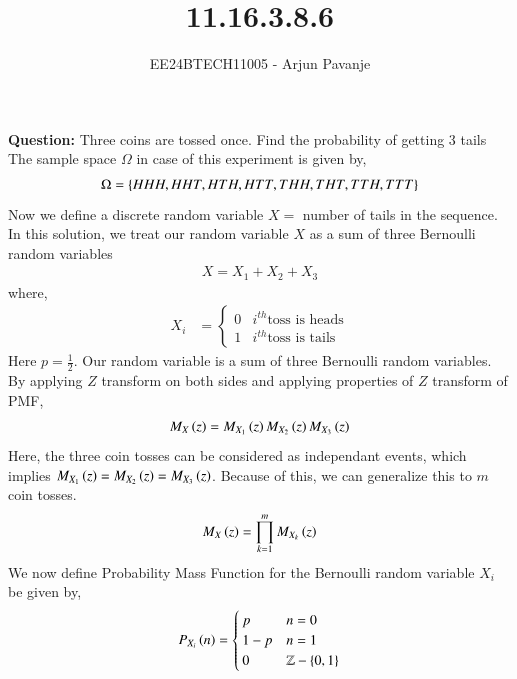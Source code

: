 \documentclass[journal]{IEEEtran}
\begin{document}

\vspace{3cm}

\title{11.16.3.8.6}
\author{EE24BTECH11005 - Arjun Pavanje}
{\let\newpage\relax\maketitle}
\textbf{Question:}\newline
Three coins are tossed once. Find the probability of getting 3 tails \newline
\solution \newline
The sample space $\Omega$ in case of this experiment is given by,
\begin{align}
  \Omega = \left\{HHH, HHT, HTH, HTT, THH, THT, TTH, TTT\right\}
\end{align} 
Now we define a discrete random variable $X =$ number of tails in the sequence. In this solution, we treat our random variable $X$ as a sum of three Bernoulli random variables
\begin{align}
 X = X_1 + X_2 + X_3
\end{align}
where,
\begin{align}
  X_i &= \begin{cases}
    0 & i^{th}\text{toss is heads}\\
    1 & i^{th}\text{toss is tails}
  \end{cases}
\end{align}
Here $p = \frac{1}{2}$. Our random variable is a sum of three Bernoulli random variables. By applying $Z$ transform on both sides and applying properties of $Z$ transform of PMF, 
\begin{align}
  M_X\left(z\right) = M_{X_1}\left(z\right) M_{X_2}\left(z\right)M_{X_3}\left(z\right) 
\end{align}
Here, the three coin tosses can be considered as independant events, which implies  $ M_{X_1}\left(z\right) = M_{X_2}\left(z\right) = M_{X_3}\left(z\right)$. Because of this, we can generalize this to $m$ coin tosses.
\begin{align}
  M_X\left(z\right) = \prod_{k=1}^{m} M_{X_k}\left(z\right)
\end{align}
We now define Probability Mass Function for the Bernoulli random variable $X_i$ be given by,
\begin{align}
  P_{X_i}\left(n\right) = \begin{cases}
    p & n = 0\\
    1-p & n = 1\\
    0 &  \mathbb{Z} - \left\{0,1\right\}
  \end{cases}
\end{align}
\end{document}
